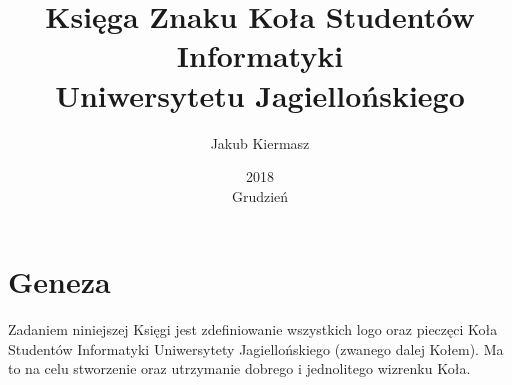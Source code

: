 \documentclass[titlepage]{mwart}
\title{Księga Znaku Koła Studentów Informatyki\\ Uniwersytetu Jagiellońskiego}
\date{2018\\ Grudzień}
\author{Jakub Kiermasz}
\newcommand{\lexsection}[1]{\section{#1}}
\begin{document}
\maketitle

\lexsection{Geneza}
Zadaniem niniejszej Księgi jest zdefiniowanie wszystkich logo oraz pieczęci Koła Studentów Informatyki Uniwersytety Jagiellońskiego (zwanego dalej Kołem). Ma to na celu stworzenie oraz utrzymanie dobrego i jednolitego wizrenku Koła. 
\end{document}
